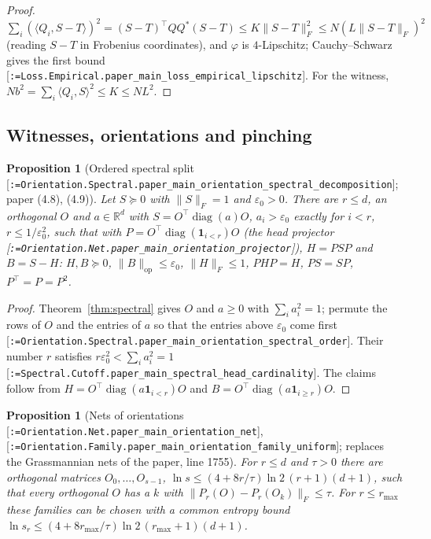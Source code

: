 \documentclass[11pt]{article}
\makeatletter
\newcommand{\formal@break}[1]{\@tfor\formal@tok:=#1\do{%
  \formal@tok
  \expandafter\ifx\formal@tok.\allowbreak\else
  \expandafter\ifx\formal@tok\_\allowbreak\fi\fi}}
\DeclareRobustCommand{\formal}[1]{\textnormal{[\texttt{\small\formal@break{#1}}]}}
\newcommand{\R}{\mathbb{R}}
\newcommand{\ip}[2]{\langle #1, #2\rangle}
\newcommand{\norm}[1]{\lVert #1\rVert}
\newcommand{\op}{\mathrm{op}}
\newcommand{\Fro}{F}
\newcommand{\one}{\mathbf{1}}
\newcommand{\diag}{\operatorname{diag}}
\theoremstyle{plain}
\newtheorem{proposition}[theorem]{Proposition}
\theoremstyle{definition}
\makeatother
\begin{document}
\begin{proof}
$\sum_i(\ip{Q_i}{S - T})^2 = (S - T)^{\top}QQ^{*}(S - T) \le K\norm{S - T}_\Fro^2 \le N(L\norm{S - T}_\Fro)^2$
(reading $S - T$ in Frobenius coordinates), and $\varphi$ is $4$-Lipschitz;
Cauchy--Schwarz gives the first bound \formal{Loss.Empirical.paper\_main\_loss\_empirical\_lipschitz}.
For the witness, $Nb^2 = \sum_i\ip{Q_i}{S}^2 \le K \le NL^2$.
\end{proof}

\subsection{Witnesses, orientations and pinching}\label{sec:witness}

\begin{proposition}[Ordered spectral split \formal{Orientation.Spectral.paper\_main\_orientation\_spectral\_decomposition}; paper (4.8), (4.9)]\label{prop:split}
Let $S \succeq 0$ with $\norm{S}_\Fro = 1$ and $\varepsilon_0 > 0$. There are
$r \le d$, an orthogonal $O$ and $a \in \R^d$ with $S = O^{\top}\diag(a)O$,
$a_i > \varepsilon_0$ exactly for $i < r$, $r \le 1/\varepsilon_0^2$, such that
with $P = O^{\top}\diag(\one_{i<r})O$ (the \emph{head projector}
\formal{Orientation.Net.paper\_main\_orientation\_projector}), $H = PSP$
and $B = S - H$: $H, B \succeq 0$, $\norm{B}_\op \le \varepsilon_0$,
$\norm{H}_\Fro \le 1$, $PHP = H$, $PS = SP$, $P^{\top} = P = P^2$.
\end{proposition}

\begin{proof}
Theorem~\ref{thm:spectral} gives $O$ and $a \ge 0$ with $\sum_ia_i^2 = 1$;
permute the rows of $O$ and the entries of $a$ so that the entries above
$\varepsilon_0$ come first \formal{Orientation.Spectral.paper\_main\_orientation\_spectral\_order}.
Their number $r$ satisfies $r\varepsilon_0^2 < \sum_ia_i^2 = 1$
\formal{Spectral.Cutoff.paper\_main\_spectral\_head\_cardinality}. The
claims follow from $H = O^{\top}\diag(a\one_{i<r})O$ and
$B = O^{\top}\diag(a\one_{i\ge r})O$.
\end{proof}

\begin{proposition}[Nets of orientations \formal{Orientation.Net.paper\_main\_orientation\_net}, \formal{Orientation.Family.paper\_main\_orientation\_family\_uniform}; replaces the Grassmannian nets of the paper, line 1755]\label{prop:onets}
For $r \le d$ and $\tau > 0$ there are orthogonal matrices $O_0, \dots, O_{s-1}$,
$\ln s \le (4 + 8r/\tau)\ln 2\,(r + 1)(d + 1)$, such that every orthogonal
$O$ has a $k$ with $\norm{P_r(O) - P_r(O_k)}_\Fro \le \tau$. For $r \le r_{\max}$
these families can be chosen with a common entropy bound
$\ln s_r \le (4 + 8r_{\max}/\tau)\ln2\,(r_{\max} + 1)(d + 1)$.
\end{proposition}
\end{document}
